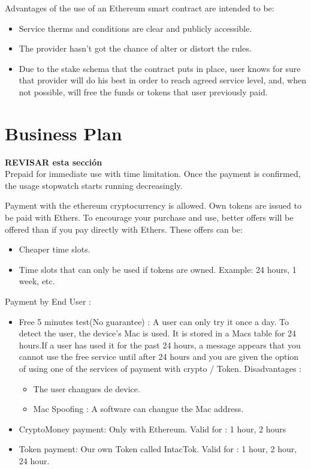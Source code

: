 \documentclass[12pt]{report}
\begin{document}
  Advantages of the use of an Ethereum smart contract are intended to be:
  \begin{itemize}
    \item Service therms and conditions are clear and publicly accessible.
    \item The provider hasn’t got the chance of alter or distort the rules.
    \item Due to the stake schema that the contract puts in place, user knows for sure that provider will do his best in order to reach agreed service level, and, when not possible, will free the funds or tokens that user previously paid.
  \end{itemize}

	\section{Business Plan}\label{sec:business-plan}
	\textbf{REVISAR esta sección}\\
  Prepaid for immediate use with time limitation. Once the payment is confirmed, the usage stopwatch starts running decreasingly.

  Payment with the ethereum cryptocurrency is allowed. Own tokens are issued to be paid with Ethers. To encourage your purchase and use, better offers will be offered than if you pay directly with Ethers. These offers can be:

  \begin{itemize}
    \item Cheaper time slots.
    \item Time slots that can only be used if tokens are owned. Example: 24 hours, 1 week, etc.
  \end{itemize}

  Payment by End User :

  \begin{itemize}
    \item Free 5 minutes test(No guarantee) : A user can only try it once a day. To detect the user, the device's Mac is used. It is stored in a Macs table for 24 hours.If a user has used it for the past 24 hours, a message appears that you cannot use the free service until after 24 hours and you are given the option of using one of the services of payment with crypto / Token. Disadvantages :
    \begin{itemize}
      \item The user changues de device.
      \item Mac Spoofing : A software can changue the Mac address.
    \end{itemize}
    \item CryptoMoney payment: Only with Ethereum. Valid for : 1 hour, 2 hours
    \item Token payment: Our own Token called IntacTok. Valid for : 1 hour, 2 hour, 24 hour.
  \end{itemize}
\end{document}
